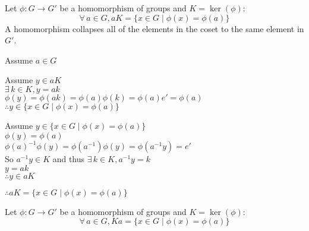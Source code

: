 \documentclass[letterpaper,12pt,fleqn]{article}
\newcommand{\p}{\phi}
\begin{document}
\begin{theorem}
  Let $\p:G\to G'$ be a homomorphism of groups and $K=\ker(\p)$:
  \[\forall\,a\in G,aK=\{x\in G\mid\p(x)=\p(a)\}\]
  A homomorphism collapses all of the elements in the coset to the same
  element in $G'$.
\end{theorem}

\begin{figure}[h]
  \setlength{\leftskip}{0.5in}
\end{figure}

\begin{theproof}
  Assume $a\in G$
  
  Assume $y\in aK$ \\
  $\exists\,k\in K,y=ak$ \\
  $\p(y)=\p(ak)=\p(a)\p(k)=\p(a)e'=\p(a)$ \\
  $\therefore y\in\{x\in G\mid\p(x)=\p(a)\}$

  Assume $y\in\{x\in G\mid\p(x)=\p(a)\}$ \\
  $\p(y)=\p(a)$ \\
  $\p(a)^{-1}\p(y)=\p(a^{-1})\p(y)=\p(a^{-1}y)=e'$ \\
  So $a^{-1}y\in K$ and thus $\exists\,k\in K,a^{-1}y=k$ \\
  $y=ak$ \\
  $\therefore y\in aK$

  $\therefore aK=\{x\in G\mid\p(x)=\p(a)\}$
\end{theproof}

\begin{theorem}
  Let $\p:G\to G'$ be a homomorphism of groups and $K=\ker(\p)$:
  \[\forall\,a\in G,Ka=\{x\in G\mid\p(x)=\p(a)\}\]
\end{theorem}
\end{document}
